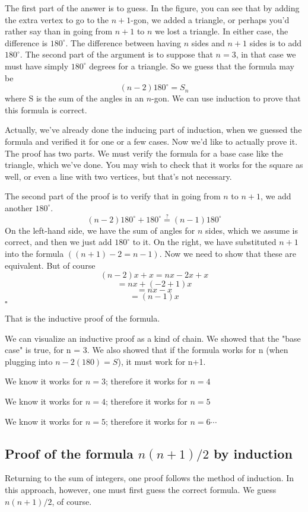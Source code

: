\documentclass[11pt, oneside]{article}   	%
\begin{document}
The first part of the answer is to guess.  In the figure, you can see that by adding the extra vertex to go to the $n+1$-gon, we added a triangle, or perhaps you'd rather say than in going from $n+1$ to $n$ we lost a triangle.  In either case, the difference is $180^\circ$.  The difference between having $n$ sides and $n+1$ sides is to add $180^\circ$.  The second part of the argument is to suppose that $n=3$, in that case we must have simply $180^\circ$ degrees for a triangle.  So we guess that the formula may be
\[ (n-2)180^\circ = S_n \]
where S is the sum of the angles in an $n$-gon.
We can use induction to prove that this formula is correct.

Actually, we've already done the inducing part of induction, when we guessed the formula and verified it for one or a few cases.  Now we'd like to actually prove it.  The proof has two parts.  We must verify the formula for a base case like the triangle, which we've done.  You may wish to check that it works for the square as well, or even a line with two vertices, but that's not necessary.

The second part of the proof is to verify that in going from $n$ to $n+1$, we add another $180^\circ$.  \[ (n-2)180^\circ + 180^\circ \stackrel{?}{=} (n-1)180^\circ \]
On the left-hand side, we have the sum of angles for $n$ sides, which we assume is correct, and then we just add $180^\circ$ to it.  On the right, we have substituted $n+1$ into the formula $((n+1)-2=n-1)$.  Now we need to show that these are equivalent.
But of course
\[ (n-2)x + x = nx - 2x + x \]
\[ = nx + (-2 + 1)x \]
\[ = nx - x \]
\[ = (n-1) x \]
$\square$

That is the inductive proof of the formula.

We can visualize an inductive proof as a kind of chain.  We showed that the "base case" is true, for n = 3.  We also showed that if the formula works for n (when plugging into $n-2(180)=S$), it must work for n+1.

We know it works for $n = 3$;  therefore it works for $n = 4$

We know it works for $n = 4$;  therefore it works for $n = 5$

We know it works for $n = 5$;  therefore it works for $n = 6 \cdots$
\subsection*{Proof of the formula $n(n+1)/2$ by induction}

Returning to the sum of integers, one proof follows the method of induction.  In this approach, however, one must first guess the correct formula.  We guess $n(n+1)/2$, of course.  
\end{document}
